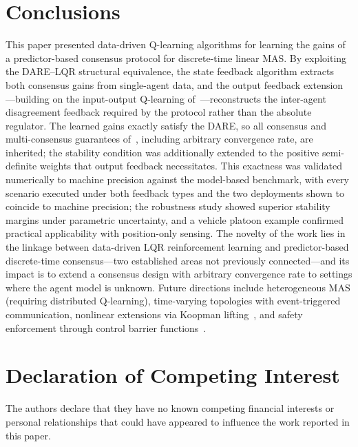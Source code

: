 \documentclass[12pt]{elsarticle}
\theoremstyle{remark}
\begin{document}
\section{Conclusions}
\label{sec:conc}
This paper presented data-driven Q-learning algorithms for learning the gains of a predictor-based consensus protocol for discrete-time linear MAS. By exploiting the DARE--LQR structural equivalence, the state feedback algorithm extracts both consensus gains from single-agent data, and the output feedback extension---building on the input-output Q-learning of~\cite{rizvi2022}---reconstructs the inter-agent disagreement feedback required by the protocol rather than the absolute regulator. The learned gains exactly satisfy the DARE, so all consensus and multi-consensus guarantees of~\cite{cacace2024}, including arbitrary convergence rate, are inherited; the stability condition was additionally extended to the positive semi-definite weights that output feedback necessitates. This exactness was validated numerically to machine precision against the model-based benchmark, with every scenario executed under both feedback types and the two deployments shown to coincide to machine precision; the robustness study showed superior stability margins under parametric uncertainty, and a vehicle platoon example confirmed practical applicability with position-only sensing. The novelty of the work lies in the linkage between data-driven LQR reinforcement learning and predictor-based discrete-time consensus---two established areas not previously connected---and its impact is to extend a consensus design with arbitrary convergence rate to settings where the agent model is unknown.
Future directions include heterogeneous MAS (requiring distributed Q-learning), time-varying topologies with event-triggered communication, nonlinear extensions via Koopman lifting~\cite{dony2024koopman}, and safety enforcement through control barrier functions~\cite{dony2025debf}.
\section*{Declaration of Competing Interest}
The authors declare that they have no known competing financial interests or personal relationships that could have appeared to influence the work reported in this paper.
\end{document}

